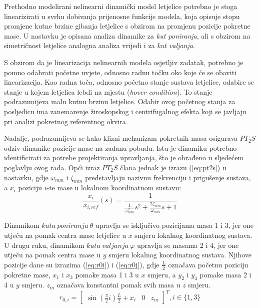 \documentclass[11pt,a4paper]{article}
\begin{document}
\medskip

Prethodno modelirani nelinearni dinamički model letjelice potrebno je stoga linearizirati u svrhu dobivanja prijenosne funkcije modela, koja opisuje stopu promjene kutne brzine gibanja letjelice s obzirom na promjenu pozicije pokretne mase. U nastavku je opisana analiza dinamike za \textit{kut poniranja}, ali s obzirom na simetričnost letjelice analogna analiza vrijedi i za \textit{kut valjanja}. 

\medskip

S obzirom da je linearizacija nelinearnih modela osjetljiv zadatak, potrebno je pomno odabrati početne uvjete, odnosno radnu točku oko koje će se obaviti linearizacija. Kao radna toča, odnosno početno stanje sustava letjelice, odabire se stanje u kojem letjelica lebdi na mjestu (\textit{hover condition}). To stanje podrazumijeva malu kutnu brzinu letjelice. Odabir ovog početnog stanja za posljedicu ima zanemarenje žiroskopskog i centrifugalnog efekta koji se javljaju pri analizi pokretnog referentnog okvira. 

\medskip

Nadalje, podrazumijeva se kako klizni mehanizam pokretnih masa osigurava $PT_{2}S$ odziv dinamike pozicije mase na zadanu pobudu. Istu je dinamiku potrebno identificirati za potrebe projektiranja upravljanja, što je obrađeno u sljedećem poglavlju ovog rada. Opći izraz $PT_{2}S$ člana jednak je izrazu (\ref{eq:pt2s}) u nastavku, gdje $\omega_{mm}$ i $\zeta_{mm}$ predstavljaju nazivnu frekvenciju i prigušenje sustava, a $x_{i}$ poziciju $i$-te mase u lokalnom koordinatnom sustavu:
\begin{equation}
\frac{x_{i}}{x_{i, ref}}(s) = \frac{1}{\frac{1}{\omega_{mm}^{2}}s^{2} + \frac{2\zeta_{mm}}{\omega_{mm}}s + 1 }
\label{eq:pt2s}
\end{equation}

Dinamikom $kuta \ poniranja \ \theta$ upravlja se isključivo pozicijama masa 1 i 3, jer one utječu na pomak centra mase letjelice u $x$ smjeru lokalnog koordinatnog sustava. U drugu ruku, dinamikom $kuta \ valjanja \ \varphi$ upravlja se masama 2 i 4, jer one utječu na pomak centra mase u $y$ smjeru lokalnog koordinatnog sustava. Njihove pozicije dane su izrazima (\ref{eq:r0i}) i (\ref{eq:r0j}), gdje $\frac{L}{2}$ označava početnu poziciju pokretne mase, $x_{1}$ i $x_{3}$ pomake masa 1 i 3 u $x$ smjeru, a $y_{2}$ i $y_{4}$ pomake masa 2 i 4 u $y$ smjeru. $z_{m}$ označava konstantni pomak svih masa u $z$ smjeru.
\begin{equation}
r_{0,i} = \left[
\begin{matrix}
\sin\left(\frac{\pi}{2}i\right)\frac{L}{2} + x_{i} & 0 & z_{m}
\end{matrix} \right] ^{T}, i \in \{ 1, 3\}
\label{eq:r0i}
\end{equation}
\end{document}
